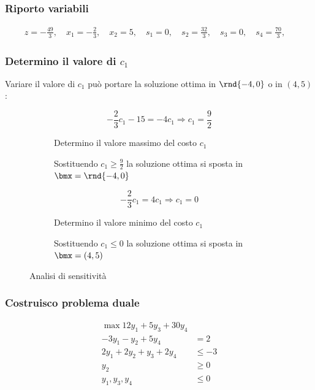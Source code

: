 \documentclass[\main/main.tex]{subfiles}
\begin{document}
\subsubsection*{Riporto variabili}

\begin{align*}
  z   = -\frac{49}{3}, \quad
  x_1 = -\frac{2}{3} , \quad
  x_2 = 5            , \quad
  s_1 = 0            , \quad
  s_2 = \frac{32}{3} , \quad
  s_3 = 0            , \quad
  s_4 = \frac{70}{3} , \quad
\end{align*}
\subsubsection*{Determino il valore di $c_1$}
Variare il valore di $c_1$ può portare la soluzione ottima in $\rnd{-4,0}$ o in $(4,5)$:

\begin{figure}
  \begin{subfigure}{0.49\textwidth}
    \[
      -\frac{2}{3}c_1 -15 = -4c_1 \Rightarrow c_1 = \frac{9}{2}
    \]
    \caption{Determino il valore massimo del costo $c_1$}
  \end{subfigure}
  \begin{subfigure}{0.49\textwidth}
    \caption{Sostituendo $c_1\geq\frac{9}{2}$ la soluzione ottima si sposta in $\bmx=\rnd{-4, 0}$}
  \end{subfigure}
  \begin{subfigure}{0.49\textwidth}
    \[
      -\frac{2}{3}c_1 = 4c_1 \Rightarrow c_1 = 0
    \]
    \caption{Determino il valore minimo del costo $c_1$}
  \end{subfigure}
  \begin{subfigure}{0.49\textwidth}
    \caption{Sostituendo $c_1\leq0$ la soluzione ottima si sposta in $\bmx=(4,5)$}
  \end{subfigure}
  \caption{Analisi di sensitività}
\end{figure}

\subsubsection*{Costruisco problema duale}
\begin{align*}
  \max 12y_1 +5y_3 + 30y_4           \\
  -3y_1 -y_2 +5y_4         & = 2     \\
  2y_1 + 2y_2 + y_3 + 2y_4 & \leq -3 \\
  y_2                      & \geq 0  \\
  y_1, y_3, y_4            & \leq 0
\end{align*}
\end{document}
